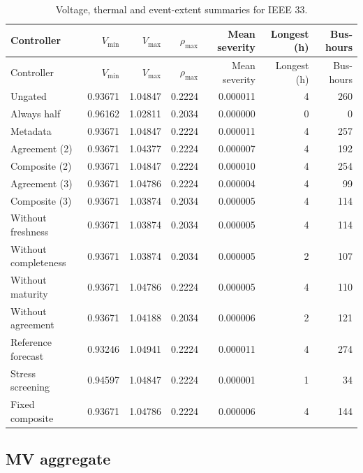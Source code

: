 \documentclass[11pt]{article}
\begin{document}
\small\begin{longtable}{lrrrrrr}
\caption{Voltage, thermal and event-extent summaries for IEEE 33.}\\\toprule
Controller & $V_{\min}$ & $V_{\max}$ & $\rho_{\max}$ & Mean severity & Longest (h) & Bus-hours\\\midrule
\endfirsthead
\toprule
Controller & $V_{\min}$ & $V_{\max}$ & $\rho_{\max}$ & Mean severity & Longest (h) & Bus-hours\\\midrule
\endhead
\bottomrule\endfoot
Ungated & 0.93671 & 1.04847 & 0.2224 & 0.000011 & 4 & 260\\
Always half & 0.96162 & 1.02811 & 0.2034 & 0.000000 & 0 & 0\\
Metadata & 0.93671 & 1.04847 & 0.2224 & 0.000011 & 4 & 257\\
Agreement (2) & 0.93671 & 1.04377 & 0.2224 & 0.000007 & 4 & 192\\
Composite (2) & 0.93671 & 1.04847 & 0.2224 & 0.000010 & 4 & 254\\
Agreement (3) & 0.93671 & 1.04786 & 0.2224 & 0.000004 & 4 & 99\\
Composite (3) & 0.93671 & 1.03874 & 0.2034 & 0.000005 & 4 & 114\\
Without freshness & 0.93671 & 1.03874 & 0.2034 & 0.000005 & 4 & 114\\
Without completeness & 0.93671 & 1.03874 & 0.2034 & 0.000005 & 2 & 107\\
Without maturity & 0.93671 & 1.04786 & 0.2224 & 0.000005 & 4 & 110\\
Without agreement & 0.93671 & 1.04188 & 0.2034 & 0.000006 & 2 & 121\\
Reference forecast & 0.93246 & 1.04941 & 0.2224 & 0.000011 & 4 & 274\\
Stress screening & 0.94597 & 1.04847 & 0.2224 & 0.000001 & 1 & 34\\
Fixed composite & 0.93671 & 1.04786 & 0.2224 & 0.000006 & 4 & 144\\
\end{longtable}\normalsize
{}\subsection{MV aggregate}
\end{document}
